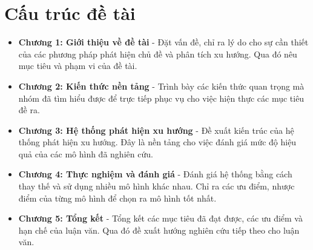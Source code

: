 \section{Cấu trúc đề tài}
\begin{itemize}
    \item \textbf{Chương 1: Giới thiệu về đề tài} - Đặt vấn đề, chỉ ra lý do cho sự cần thiết của các phương pháp phát hiện chủ đề và phân tích xu hướng. Qua đó nêu mục tiêu và phạm vi của đề tài.
    \item \textbf{Chương 2: Kiến thức nền tảng} - Trình bày các kiến thức quan trọng mà nhóm đã tìm hiểu được để trực tiếp phục vụ cho việc hiện thực các mục tiêu đề ra.
    \item \textbf{Chương 3: Hệ thống phát hiện xu hướng} - Đề xuất kiến trúc của hệ thống phát hiện xu hướng. Đây là nền tảng cho việc đánh giá mức độ hiệu quả của các mô hình đã nghiên cứu.
    \item \textbf{Chương 4: Thực nghiệm và đánh giá} - Đánh giá hệ thống bằng cách thay thế và sử dụng nhiều mô hình khác nhau. Chỉ ra các ưu điểm, nhược điểm của từng mô hình để chọn ra mô hình tốt nhất.
    \item \textbf{Chương 5: Tổng kết} - Tổng kết các mục tiêu đã đạt được, các ưu điểm và hạn chế của luận văn. Qua đó đề xuất hướng nghiên cứu tiếp theo cho luận văn.
\end{itemize}